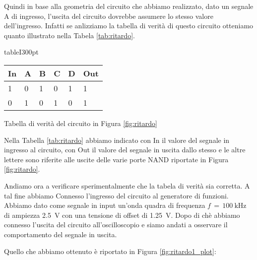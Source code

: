 Quindi in base alla geometria del circuito che abbiamo realizzato, dato un segnale A di ingresso, l'uscita del circuito dovrebbe assumere lo stesso valore dell'ingresso. Infatti se anlizziamo la tabella di verità di questo circuito otteniamo quanto illustrato nella Tabela \ref{tab:ritardo}.

\begin{wrapfloat}{table}{I}{300pt}
\centering
	\begin{tabular}{l | llll | l}
	\toprule
		In & A & B & C & D & Out\\
	\midrule
		1 & 0 & 1 & 0 & 1 & 1 \\
		0 & 1 & 0 & 1 & 0 & 1 \\
	\bottomrule
	\end{tabular}
	\caption{Tabella di verità del circuito in Figura \ref{fig:ritardo}}
	\label{tab:ritardo}
\end{wrapfloat}

Nella Tabella \ref{tab:ritardo} abbiamo indicato con In il valore del segnale in ingresso al circuito, con Out il valore del segnale in uscita dallo stesso e le altre lettere sono riferite alle uscite delle varie porte NAND riportate in Figura \ref{fig:ritardo}.

Andiamo ora a verificare sperimentalmente che la tabela di verità sia corretta. A tal fine abbiamo Connesso l'ingresso del circuito al generatore di funzioni. Abbiamo dato come segnale in input un'onda quadra di frequenza $f\,=\,\SI{100}{\kilo\hertz}$ di ampiezza \SI{2.5}{\volt} con una tensione di offset di \SI{1.25}{\volt}. Dopo di chè abbiamo connesso l'uscita del circuito all'oscilloscopio e siamo andati a osservare il comportamento del segnale in uscita.

Quello che abbiamo ottenuto è riportato in Figura \ref{fig:ritardo1_plot}:

